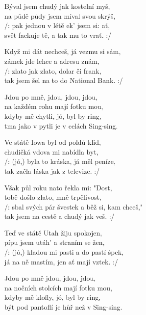 
\ve{}
Býval jsem chudý jak kostelní myš,\\
na půdě půdy jsem míval svou skrýš,\\
/: pak jednou v létě ek' jsem si: ať,\\
svět fackuje tě, a tak mu to vrať. :/ 

\ve{}
Když mi dát nechceš, já vezmu si sám,\\
zámek jde lehce a adresu znám,\\
/: zlato jak zlato, dolar či frank,\\
tak jsem šel na to do National Bank. :/ 

\cho{}
Jdou po mně, jdou, jdou, jdou,\\
na každém rohu mají fotku mou,\\
kdyby mě chytli, jó, byl by ring,\\
tma jako v pytli je v celách Sing-sing.  

\ve{}
Ve státě Iowa byl od poldů klid,\\
chudičká vdova mi nabídla byt,\\
/: (jó,) byla to kráska, já měl peníze,\\
tak začla láska jak z televize. :/ 

\ve{}
Však půl roku nato řekla mi: "Dost,\\
tobě došlo zlato, mně trpělivost,\\
/: sbal svých pár švestek a běž si, kam chceš,"\\
tak jsem na cestě a chudý jak veš. :/ 

\cho{} 

\ve{}
Teď ve státě Utah žiju spokojen,\\
pípu jsem utáh' a straním se žen,\\
/: (jó,) kladou mi pasti a do pastí špek,\\
já na ně mastím, jen ať mají vztek. :/ 

\cho{}
Jdou po mně jdou, jdou, jdou,\\
na nočních stolcích mají fotku mou,\\
kdyby mě klofly, jó, byl by ring,\\
být pod pantoflí je hůř než v Sing-sing. 

\esong